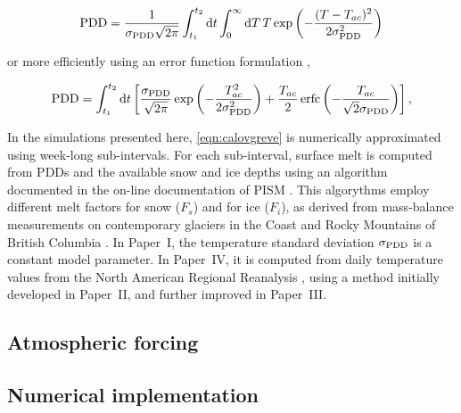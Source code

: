 \documentclass{article}
\newcommand{\unit}[1]{\ensuremath{\mathrm{#1}}}
\newcommand{\degree}[0]{\ensuremath{^{\circ}}}
\begin{document}
\begin{equation}
    \mathrm{PDD} = \frac{1}{\sigma_{\mathrm{PDD}}\sqrt{2\pi}}
        \int_{t_1}^{t_2} \mathrm{d}t
        \int_{0}^{\infty} \mathrm{d}T \,
        T \exp\left({-\frac{(T-T_{ac})^2}{2\sigma_{\mathrm{PDD}}^2}}\right)
\end{equation}

or more efficiently using an error function formulation
\citep{Calov.Greve.2005},

\begin{equation}
    \label{eqn:calovgreve}
    \mathrm{PDD} = \int_{t_1}^{t_2} \mathrm{d}t
        \left[\frac{\sigma_{\mathrm{PDD}}}{\sqrt{2\pi}}
                \exp\left({-\frac{T_{ac}^2}{2\sigma_{\mathrm{PDD}}^2}}\right)
              + \frac{T_{ac}}{2} \, \mathrm{erfc}
                \left(-\frac{T_{ac}}{\sqrt{2}\sigma_{\mathrm{PDD}}}\right)\right],
\end{equation}

In the simulations presented here, \cref{eqn:calovgreve} is numerically
approximated using week-long sub-intervals. For each sub-interval, surface melt
is computed from PDDs and the available snow and ice depths using an algorithm
documented in the on-line documentation of PISM \citep{PISM-authors.2014}. This
algorythms employ different melt factors for snow ($F_s$) and for ice ($F_i$),
as derived from mass-balance measurements on contemporary glaciers in the
Coast and Rocky Mountains of British Columbia \citep{Shea.etal.2009}. In
Paper~I, the temperature standard deviation $\sigma_{\mathrm{PDD}}$ is a constant model
parameter. In Paper~IV, it is computed from daily temperature values from the
North American Regional Reanalysis \citep[NARR,][]{Mesinger.etal.2006}, using
a method initially developed in Paper~II, and further improved in Paper~III.

\subsection{Atmospheric forcing}

\subsection{Numerical implementation}
\end{document}
